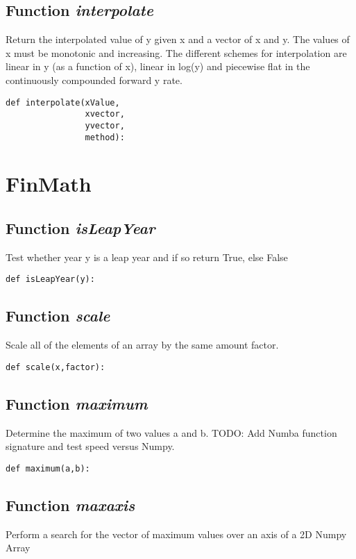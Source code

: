 \documentclass[twoside,11pt]{book}
\begin{document}
\subsection{Function {\it interpolate}}
Return the interpolated value of y given x and a vector of x and y. The values of x must be monotonic and increasing. The different schemes for interpolation are linear in y (as a function of x), linear in log(y) and piecewise flat in the continuously compounded forward y rate. 

\begin{lstlisting}
def interpolate(xValue, 
                xvector, 
                yvector, 
                method):
\end{lstlisting}

\newpage
\section{FinMath}

\subsection{Function {\it isLeapYear}}
Test whether year y is a leap year and if so return True, else False 

\begin{lstlisting}
def isLeapYear(y):
\end{lstlisting}

\subsection{Function {\it scale}}
Scale all of the elements of an array by the same amount factor. 

\begin{lstlisting}
def scale(x,factor):
\end{lstlisting}

\subsection{Function {\it maximum}}
Determine the maximum of two values a and b. TODO: Add Numba function signature and test speed versus Numpy. 

\begin{lstlisting}
def maximum(a,b):
\end{lstlisting}

\subsection{Function {\it maxaxis}}
Perform a search for the vector of maximum values over an axis of a 2D Numpy Array 
\end{document}
